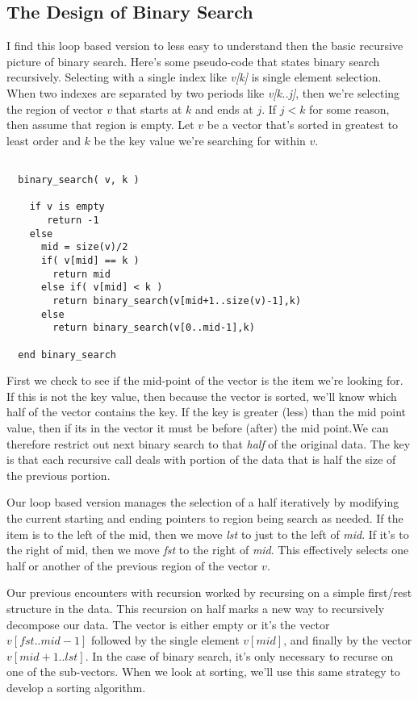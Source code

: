 \documentclass[]{tufte-handout}
\begin{document}
\subsection{The Design of Binary Search}

I find this loop based version to less easy to understand then the basic recursive picture of binary search. Here's some pseudo-code that states binary search recursively.  Selecting with a single index like \textit{v[k]} is single element selection. When two indexes are separated by two periods like \textit{v[k..j]}, then we're selecting the region of vector $v$ that starts at $k$ and ends at $j$.  If $j < k$ for some reason, then assume that region is empty. Let $v$ be a vector that's sorted in greatest to least order and $k$ be the key value we're searching for within $v$.  
\begin{verbatim}

  binary_search( v, k )
    
    if v is empty
       return -1
    else 
      mid = size(v)/2
      if( v[mid] == k )
        return mid
      else if( v[mid] < k )
        return binary_search(v[mid+1..size(v)-1],k)
      else
        return binary_search(v[0..mid-1],k)
      
  end binary_search   
\end{verbatim}

First we check to see if the mid-point of the vector is the item we're looking for.  If this is not the key value, then because the vector is sorted, we'll know which half of the vector contains the key. If the key is greater (less) than the mid point value, then if its in the vector it must be before (after) the mid point.We can therefore restrict out next binary search to that \textit{half} of the original data. The key is that each recursive call deals with portion of the data that is half the size of the previous portion. 

Our loop based version manages the selection of a half iteratively by modifying the current starting and ending pointers to region being search as needed. If the item is to the left of the mid, then we move \textit{lst} to just to the left of \textit{mid}. If it's to the right of mid, then we move \textit{fst} to the right of \textit{mid}. This effectively selects one half or another of the previous region of the vector $v$. 

Our previous encounters with recursion worked by recursing on a simple first/rest structure in the data. This recursion on half marks a new way to recursively decompose our data. The vector is either empty or it's the vector $v[fst..mid-1]$ followed by the single element $v[mid]$, and finally by the vector $v[mid+1..lst]$. In the case of binary search, it's only necessary to recurse on one of the sub-vectors. When we look at sorting, we'll use this same strategy to develop a sorting algorithm. 
\end{document}
